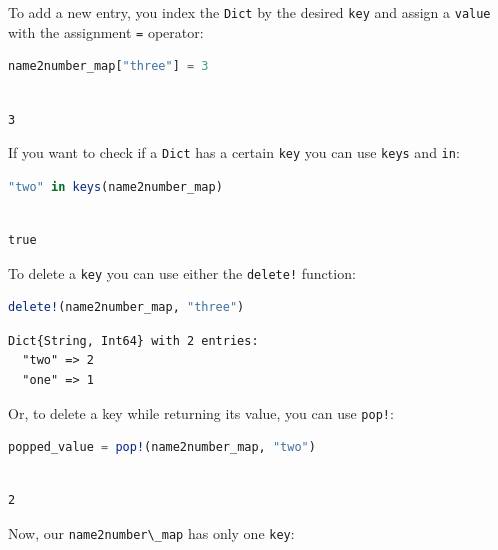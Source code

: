 \documentclass[
  notoc %
]{tufte-book}
\newcommand{\passthrough}[1]{#1}
\begin{document}
To add a new entry, you index the \passthrough{\lstinline!Dict!} by the
desired \passthrough{\lstinline!key!} and assign a
\passthrough{\lstinline!value!} with the assignment
\passthrough{\lstinline!=!} operator:

\begin{lstlisting}[language=Julia]
name2number_map["three"] = 3
\end{lstlisting}

\begin{lstlisting}[language=Output]

3

\end{lstlisting}

If you want to check if a \passthrough{\lstinline!Dict!} has a certain
\passthrough{\lstinline!key!} you can use \passthrough{\lstinline!keys!}
and \passthrough{\lstinline!in!}:

\begin{lstlisting}[language=Julia]
"two" in keys(name2number_map)
\end{lstlisting}

\begin{lstlisting}[language=Output]

true

\end{lstlisting}

To delete a \passthrough{\lstinline!key!} you can use either the
\passthrough{\lstinline"delete!"} function:

\begin{lstlisting}[language=Julia]
delete!(name2number_map, "three")
\end{lstlisting}

\begin{lstlisting}[language=Output]
Dict{String, Int64} with 2 entries:
  "two" => 2
  "one" => 1
\end{lstlisting}

Or, to delete a key while returning its value, you can use
\passthrough{\lstinline"pop!"}:

\begin{lstlisting}[language=Julia]
popped_value = pop!(name2number_map, "two")
\end{lstlisting}

\begin{lstlisting}[language=Output]

2

\end{lstlisting}

Now, our \passthrough{\lstinline!name2number\_map!} has only one
\passthrough{\lstinline!key!}:
\end{document}
